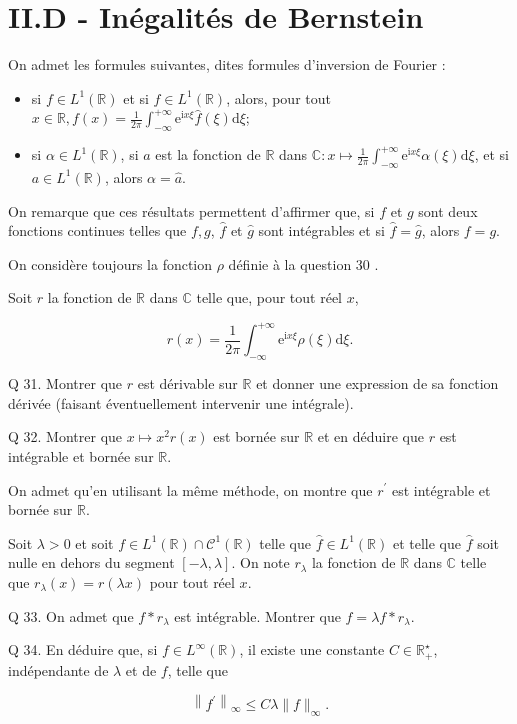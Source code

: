 \documentclass[10pt]{article}
\begin{document}
\section{II.D - Inégalités de Bernstein}
On admet les formules suivantes, dites formules d'inversion de Fourier :

\begin{itemize}
  \item si $f \in L^{1}(\mathbb{R})$ et si $\hat{f} \in L^{1}(\mathbb{R})$, alors, pour tout $x \in \mathbb{R}, f(x)=\frac{1}{2 \pi} \int_{-\infty}^{+\infty} \mathrm{e}^{\mathrm{i} x \xi} \hat{f}(\xi) \mathrm{d} \xi$;

  \item si $\alpha \in L^{1}(\mathbb{R})$, si $a$ est la fonction de $\mathbb{R}$ dans $\mathbb{C}: x \mapsto \frac{1}{2 \pi} \int_{-\infty}^{+\infty} \mathrm{e}^{\mathrm{i} x \xi} \alpha(\xi) \mathrm{d} \xi$, et si $a \in L^{1}(\mathbb{R})$, alors $\alpha=\hat{a}$.

\end{itemize}

On remarque que ces résultats permettent d'affirmer que, si $f$ et $g$ sont deux fonctions continues telles que $f, g$, $\hat{f}$ et $\hat{g}$ sont intégrables et si $\hat{f}=\hat{g}$, alors $f=g$.

On considère toujours la fonction $\rho$ définie à la question 30 .

Soit $r$ la fonction de $\mathbb{R}$ dans $\mathbb{C}$ telle que, pour tout réel $x$,

$$
r(x)=\frac{1}{2 \pi} \int_{-\infty}^{+\infty} \mathrm{e}^{\mathrm{i} x \xi} \rho(\xi) \mathrm{d} \xi .
$$

Q 31. Montrer que $r$ est dérivable sur $\mathbb{R}$ et donner une expression de sa fonction dérivée (faisant éventuellement intervenir une intégrale).

Q 32. Montrer que $x \mapsto x^{2} r(x)$ est bornée sur $\mathbb{R}$ et en déduire que $r$ est intégrable et bornée sur $\mathbb{R}$.

On admet qu'en utilisant la même méthode, on montre que $r^{\prime}$ est intégrable et bornée sur $\mathbb{R}$.

Soit $\lambda>0$ et soit $f \in L^{1}(\mathbb{R}) \cap \mathcal{C}^{1}(\mathbb{R})$ telle que $\hat{f} \in L^{1}(\mathbb{R})$ et telle que $\hat{f}$ soit nulle en dehors du segment $[-\lambda, \lambda]$. On note $r_{\lambda}$ la fonction de $\mathbb{R}$ dans $\mathbb{C}$ telle que $r_{\lambda}(x)=r(\lambda x)$ pour tout réel $x$.

Q 33. On admet que $f * r_{\lambda}$ est intégrable. Montrer que $f=\lambda f * r_{\lambda}$.

Q 34. En déduire que, si $f \in L^{\infty}(\mathbb{R})$, il existe une constante $C \in \mathbb{R}_{+}^{\star}$, indépendante de $\lambda$ et de $f$, telle que

$$
\left\|f^{\prime}\right\|_{\infty} \leqslant C \lambda\|f\|_{\infty} .
$$
\end{document}
